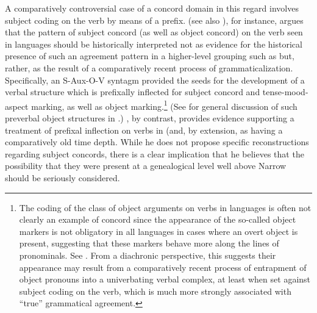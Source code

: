 \documentclass[output=paper ,collection	  ,collectionchapter ,biblatexbackend=biber   ]{langscibook}
\begin{document}
\largerpage[-1]
A comparatively controversial case of a concord domain in this regard involves
subject coding on the verb by means of a prefix.
 (see also
), for instance, argues that the pattern of
subject concord (as well as object concord) on the verb seen in  languages
should be historically interpreted not as evidence for the historical presence
of such an agreement pattern in a higher-level grouping such as 
but, rather, as the result of a comparatively recent process of
grammaticalization. Specifically, an S-Aux-O-V syntagm provided the seeds for the
development of a verbal structure which is prefixally inflected for subject
concord and tense-mood-aspect marking, as well as object marking.{\footnote{The
coding of the class of object arguments on verbs in  languages is often not
clearly an example of concord since the appearance of the so-called object
markers is not obligatory in all languages in cases where an overt object is
present, suggesting that these markers behave more along the lines of
pronominals. See . From a diachronic perspective,
this suggests their appearance may result from a comparatively recent process
of entrapment of object pronouns into a univerbating verbal complex, at least
when set against subject coding on the verb, which is much more strongly
associated with ``true'' grammatical agreement.}} (See
 for general discussion of such preverbal object
structures in .) , by contrast, provides
evidence supporting a treatment of prefixal inflection on verbs in 
(and, by extension,  as having a comparatively old time
depth. While he does not propose specific reconstructions regarding subject
concords, there is a clear implication that he believes that the possibility
that they were present at a genealogical level well above Narrow  should be
seriously considered.
\end{document}
